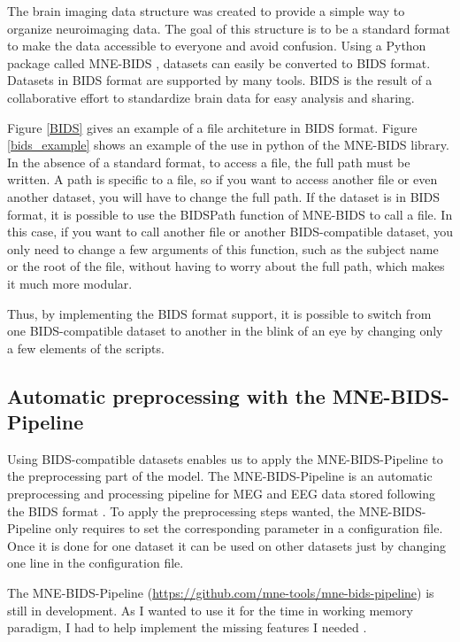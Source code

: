 The brain imaging data structure was created to provide a simple way to organize neuroimaging data. The goal of this structure is to be a standard format to make the data accessible to everyone and avoid confusion. Using a Python package called MNE-BIDS \cite{appelhoff2019mne}, datasets can easily be converted to BIDS format. Datasets in BIDS format are supported by many tools. BIDS is the result of a collaborative effort to standardize brain data for easy analysis and sharing.

Figure \ref{BIDS} gives an example of a file architeture in BIDS format. Figure \ref{bids_example} shows an example of the use in python of the MNE-BIDS library. In the absence of a standard format, to access a file, the full path must be written. A path is specific to a file, so if you want to access another file or even another dataset, you will have to change the full path. If the dataset is in BIDS format, it is possible to use the BIDSPath function of MNE-BIDS to call a file. In this case, if you want to call another file or another BIDS-compatible dataset, you only need to change a few arguments of this function, such as the subject name or the root of the file, without having to worry about the full path, which makes it much more modular.

Thus, by implementing the BIDS format support, it is possible to switch from one BIDS-compatible dataset to another in the blink of an eye by changing only a few elements of the scripts.

\subsection{Automatic preprocessing with the MNE-BIDS-Pipeline}

Using BIDS-compatible datasets enables us to apply the MNE-BIDS-Pipeline to the preprocessing part of the model. The MNE-BIDS-Pipeline is an automatic preprocessing and processing pipeline for MEG and EEG data stored following the BIDS format \cite{gorgolewski2016brain}. To apply the preprocessing steps wanted, the MNE-BIDS-Pipeline only requires to set the corresponding parameter in a configuration file. Once it is done for one dataset it can be used on other datasets just by changing one line in the configuration file.

The MNE-BIDS-Pipeline (\url{https://github.com/mne-tools/mne-bids-pipeline}) is still in development. As I wanted to use it for the time in working memory paradigm, I had to help implement the missing features I needed .

